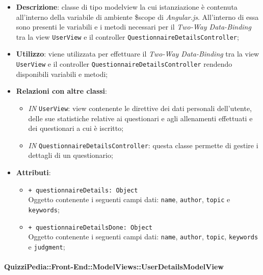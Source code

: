 	\begin{itemize}
		\item \textbf{Descrizione}: classe di tipo modelview la cui istanziazione è contenuta all'interno della variabile di ambiente \$scope di \textit{Angular.js}. All'interno di essa sono presenti le variabili e i metodi necessari per il \textit{Two-Way Data-Binding} tra la view \texttt{UserView} e il controller \texttt{QuestionnaireDetailsController};
		\item \textbf{Utilizzo}: viene utilizzata per effettuare il \textit{Two-Way Data-Binding} tra la view \texttt{UserView} e il controller \texttt{QuestionnaireDetailsController} rendendo disponibili variabili e metodi;
		\item \textbf{Relazioni con altre classi}: 
		\begin{itemize}
			\item \textit{IN} \texttt{UserView}: view contenente le direttive dei dati personali dell'utente, delle sue statistiche relative ai questionari e agli allenamenti effettuati e dei questionari a cui è iscritto; 
			\item \textit{IN} \texttt{QuestionnaireDetailsController}: questa classe permette di gestire i dettagli di un questionario;
		\end{itemize}
		\item \textbf{Attributi}: 
		\begin{itemize}
			\item \texttt{+ questionnaireDetails: Object} \\ Oggetto contenente i seguenti campi dati: \texttt{name}, \texttt{author}, \texttt{topic} e \texttt{keywords};\\
			\item \texttt{+ questionnaireDetailsDone: Object} \\ Oggetto contenente i seguenti campi dati: \texttt{name}, \texttt{author}, \texttt{topic}, \texttt{keywords} e \texttt{judgment};
		\end{itemize}
	\end{itemize}
	
		\paragraph{QuizziPedia::Front-End::ModelViews::UserDetailsModelView}
		
		\label{QuizziPedia::Front-End::ModelViews::UserDetailsModelView}
		
